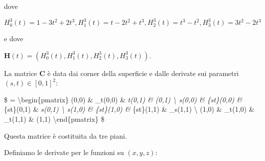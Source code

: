 \documentclass[11pt]{article}
\begin{document}
dove

\(H^3_0(t) = 1 - 3t^2 + 2t^3, H^3_1(t) = t -2t^2 + t^3, H^3_2(t) = t^3 - t^2, H^3_3(t) = 3t^2 - 2t^3\)

e dove

\(\mathbf{H}(t) = (H^3_0(t), H^3_1(t), H^3_2(t), H^3_3(t))\).

La matrice \(\mathbf{C}\) è data dai corner della superficie e dalle
derivate sui parametri \((s, t) \in [0, 1]^2\):

\$  = \textbackslash{}begin\{pmatrix\} (0,0) \&
\_t(0,0) \& \emph{t(0,1) \& (0,1)
\textbackslash{} \emph{s(0,0) \& }\{st\}(0,0) \&
}\{st\}(0,1) \& \emph{s(0,1) \textbackslash{}
\emph{s(1,0) \& }\{st\}(1,0) \&
}\{st\}(1,1) \& \_s(1,1) \textbackslash{}
(1,0) \& \_t(1,0) \& \_t(1,1) \&
(1,1) \textbackslash{}end\{pmatrix\} \$

Questa matrice è costituita da tre piani.

Definiamo le derivate per le funzioni su \((x, y, z)\):
\end{document}
